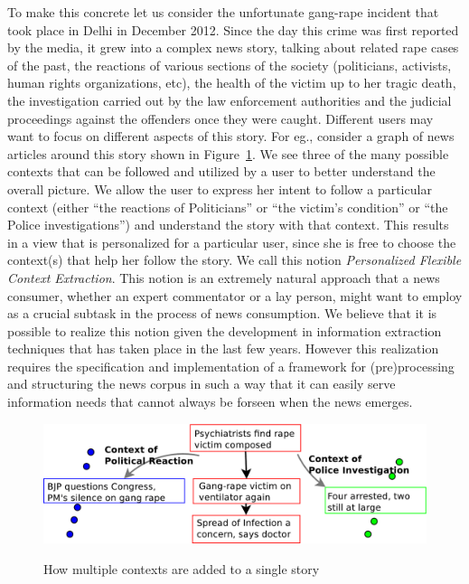 To make this concrete let us consider the unfortunate gang-rape
incident that took place in Delhi in December 2012. Since the day this
crime was first reported by the media, it grew into a complex news
story, talking about related rape cases of the past, the reactions of
various sections of the society (politicians, activists, human rights
organizations, etc), the health of the victim up to her tragic death,
the investigation carried out by the law enforcement authorities and
the judicial proceedings against the offenders once they were
caught. Different users may want to focus on different aspects of this
story. For eg., consider a graph of news articles around this story
shown in Figure~\ref{fig:context-adding-graph-gang-rape-1}.  We see
three of the many possible contexts that can be followed and utilized
by a user to better understand the overall picture. We allow the user
to express her intent to follow a particular context (either ``the
reactions of Politicians'' or ``the victim's condition'' or ``the
Police investigations'') and understand the story with that
context. This results in a view that is personalized for a particular
user, since she is free to choose the context(s) that help her follow
the story. We call this notion \emph{Personalized Flexible Context
  Extraction}. This notion is an extremely natural approach that a news
consumer, whether an expert commentator or a lay person, might want to
employ as a crucial subtask in the process of news consumption. We
believe that it is possible to realize this notion given the
development in information extraction techniques that has taken place
in the last few years. However this realization requires the
specification and implementation of a  framework for
(pre)processing and structuring the news corpus in such a way that it
can easily serve information needs that cannot always be forseen when
the news emerges.

\begin{figure}[ht]
\caption{How multiple contexts are added to a single story}
\includegraphics[scale=0.31]{figures/graph-3.pdf}
\label{fig:context-adding-graph-gang-rape-1}
\end{figure}


